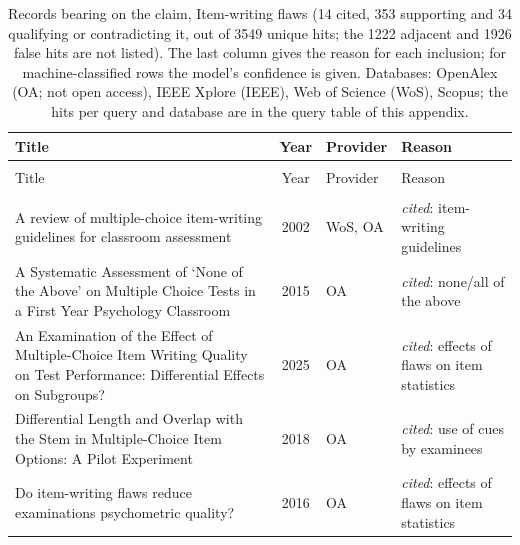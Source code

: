 
\begingroup\footnotesize
\begin{longtable}{@{}%
  >{\raggedright\arraybackslash}p{}c%
  >{\raggedright\arraybackslash}p{}%
  >{\raggedright\arraybackslash}p{}@{}}
\caption{Records bearing on the claim, Item-writing flaws (14 cited, 353 supporting and 34 qualifying or contradicting it, out of 3549 unique hits; the 1222 adjacent and 1926 false hits are not listed). The last column gives the reason for each inclusion; for machine-classified rows the model's confidence is given. Databases: OpenAlex (OA; not open access), IEEE Xplore (IEEE), Web of Science (WoS), Scopus; the hits per query and database are in the query table of this appendix.}\label{tab:sok-item-flaws}\\
\toprule
Title & Year & Provider & Reason \\
\midrule
\endfirsthead
\multicolumn{4}{@{}l}{\emph{\tablename~\thetable{} (cont.)}}\\
\toprule
Title & Year & Provider & Reason \\
\midrule
\endhead
\midrule \multicolumn{4}{r@{}}{\emph{continued on next page}}\\
\endfoot
\bottomrule
\endlastfoot
A review of multiple-choice item-writing guidelines for classroom assessment & 2002 & WoS, OA & \emph{cited}: item-writing guidelines \\
A Systematic Assessment of `None of the Above' on Multiple Choice Tests in a First Year Psychology Classroom & 2015 & OA & \emph{cited}: none/all of the above \\
An Examination of the Effect of Multiple-Choice Item Writing Quality on Test Performance: Differential Effects on Subgroups? & 2025 & OA & \emph{cited}: effects of flaws on item statistics \\
Differential Length and Overlap with the Stem in Multiple-Choice Item Options: A Pilot Experiment & 2018 & OA & \emph{cited}: use of cues by examinees \\
Do item-writing flaws reduce examinations psychometric quality? & 2016 & OA & \emph{cited}: effects of flaws on item statistics \\

\end{longtable}
